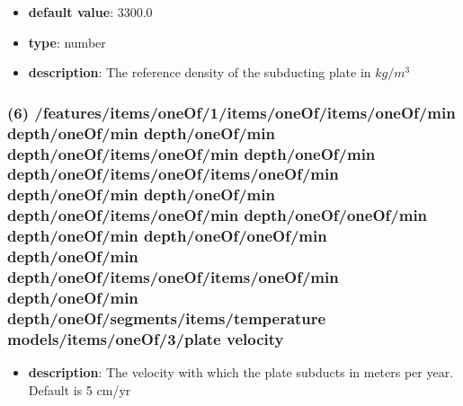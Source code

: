 \begin{itemize}[leftmargin=6em]\item {\bf default value}: 3300.0
\item {\bf type}: number
\item {\bf description}: The reference density of the subducting plate in $kg/m^3$
\end{itemize}\subsubsection{(6) /features/items/oneOf/1/items/oneOf/items/oneOf/min depth/oneOf/min depth/oneOf/min depth/oneOf/items/oneOf/min depth/oneOf/min depth/oneOf/items/oneOf/items/oneOf/min depth/oneOf/min depth/oneOf/min depth/oneOf/items/oneOf/min depth/oneOf/oneOf/min depth/oneOf/min depth/oneOf/oneOf/min depth/oneOf/min depth/oneOf/items/oneOf/items/oneOf/min depth/oneOf/min depth/oneOf/segments/items/temperature models/items/oneOf/3/plate velocity}
\begin{itemize}[leftmargin=6em]\item {\bf description}: The velocity with which the plate subducts in meters per year. Default is 5 cm/yr
\end{itemize}
